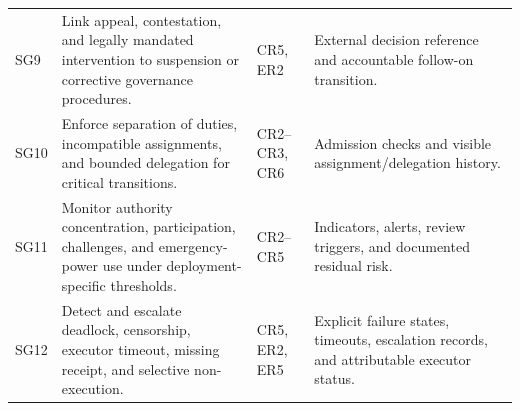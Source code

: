 \documentclass[journal]{IEEEtran}
\begin{document}
\begin{table}[t]
\begin{tabular}{p{1.0cm}p{6.1cm}p{2.2cm}p{6.9cm}}
SG9 &
Link appeal, contestation, and legally mandated
intervention to suspension or corrective
governance procedures. &
CR5, ER2 &
External decision reference and accountable
follow-on transition.\\

SG10 &
Enforce separation of duties, incompatible assignments,
and bounded delegation for critical transitions. &
CR2--CR3, CR6 &
Admission checks and visible assignment/delegation
history.\\

SG11 &
Monitor authority concentration, participation,
challenges, and emergency-power use under
deployment-specific thresholds. &
CR2--CR5 &
Indicators, alerts, review triggers, and documented
residual risk.\\

SG12 &
Detect and escalate deadlock, censorship, executor
timeout, missing receipt, and selective non-execution. &
CR5, ER2, ER5 &
Explicit failure states, timeouts, escalation records,
and attributable executor status.\\

\hline
\end{tabular}
\end{table}




\end{document}
